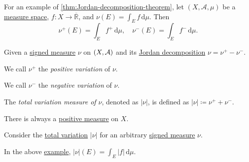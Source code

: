 \begin{eg}\label{eg:lec30}
	For an example of \autoref{thm:Jordan-decomposition-theorem}, let \((X, \mathcal{A}, \mu)\) be a \hyperref[def:measure-space]{measure space},
	\(f \colon X \to \overline{\mathbb{R}}\), and \(\nu(E) = \int_E f \,\mathrm{d} \mu\). Then
	\[
		\nu^+(E) = \int_E f^+ \,\mathrm{d} \mu,\quad \nu^-(E) = \int_E f^- \,\mathrm{d} \mu.
	\]
\end{eg}

\begin{definition*}
	Given a \hyperref[def:signed-measure]{signed measure} \(\nu \) on \((X, \mathcal{\MakeUppercase{a}} )\) and its
	\hyperref[thm:Jordan-decomposition-theorem]{Jordan decomposition} \(\nu = \nu ^+ - \nu ^-\).
	\begin{definition}\label{def:positive-variation}
		We call \(\nu ^+\) the \emph{positive variation} of \(\nu \).
	\end{definition}
	\begin{definition}\label{def:negative-variation}
		We call \(\nu ^-\) the \emph{negative variation} of \(\nu \).
	\end{definition}
	\begin{definition}\label{def:total-variation}
		The \emph{total variation measure of \(\nu\)}, denoted as \(\left\vert \nu \right\vert \), is defined as \(\left\vert \nu \right\vert \coloneqq \nu^+ + \nu^-\).
	\end{definition}
\end{definition*}

\begin{remark}
	There is always a \hyperref[def:signed-measure]{positive measure} on \(X\).
\end{remark}
\begin{explanation}
	Consider the \hyperref[def:total-variation]{total variation} \(\left\vert \nu \right\vert \) for an arbitrary \hyperref[def:signed-measure]{signed measure} \(\nu \).
\end{explanation}

\begin{eg}
	In the above \hyperref[eg:lec30]{example}, \(\left\vert \nu \right\vert (E) = \int_E \left\vert f \right\vert \,\mathrm{d} \mu\).
\end{eg}

